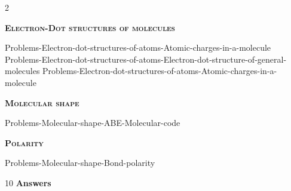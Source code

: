 \documentclass[main.tex]{subfiles}
\begin{document}
\newpage
\fancyhfoffset[E,O]{0pt}
\setlength{\columnsep}{30pt}
\begin{conclusion}
\end{conclusion}
\begin{multicols*}{2}\setcounter{numA}{1}  %













\newcommand\chapterlabel{Ch-electronicstructure}
{\raggedright\textsc{\textbf{Electron-Dot structures of molecules }}\par}
{Problems-Electron-dot-structures-of-atoms-Atomic-charges-in-a-molecule}
{Problems-Electron-dot-structures-of-atoms-Electron-dot-structure-of-general-molecules}
{Problems-Electron-dot-structures-of-atoms-Atomic-charges-in-a-molecule}
{\raggedright\textsc{\textbf{Molecular shape}}\par}
{Problems-Molecular-shape-ABE-Molecular-code}
{\raggedright\textsc{\textbf{Polarity}}\par}
{Problems-Molecular-shape-Bond-polarity} 

 

\end{multicols*}
\newpage
\begin{answersenvironment}
\begin{minipage}[c]{1\textwidth}
\begin{localsize}{10}
{\Large \bf Answers}
   \printsolutions[byID={1,3,5,7,9,11}]  
\end{localsize}
\end{minipage}\end{answersenvironment}
\end{document}
